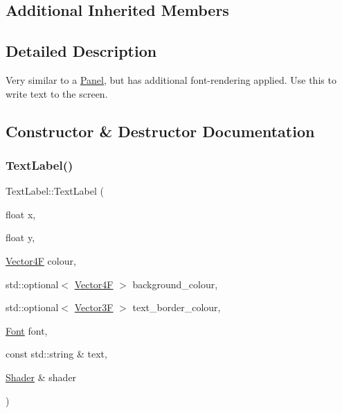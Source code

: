 \subsection*{Additional Inherited Members}


\subsection{Detailed Description}
Very similar to a \mbox{\hyperlink{class_panel}{Panel}}, but has additional font-\/rendering applied. Use this to write text to the screen. 

\subsection{Constructor \& Destructor Documentation}
\mbox{\label{class_text_label_a8736731b5c5f1a8cffa984cfc332a859}} 
\subsubsection{\texorpdfstring{Text\+Label()}{TextLabel()}}
{\footnotesize\ttfamily Text\+Label\+::\+Text\+Label (\begin{DoxyParamCaption}\item[{float}]{x,  }\item[{float}]{y,  }\item[{\mbox{\hyperlink{class_vector4}{Vector4F}}}]{colour,  }\item[{std\+::optional$<$ \mbox{\hyperlink{class_vector4}{Vector4F}} $>$}]{background\+\_\+colour,  }\item[{std\+::optional$<$ \mbox{\hyperlink{class_vector3}{Vector3F}} $>$}]{text\+\_\+border\+\_\+colour,  }\item[{\mbox{\hyperlink{class_font}{Font}}}]{font,  }\item[{const std\+::string \&}]{text,  }\item[{\mbox{\hyperlink{class_shader}{Shader}} \&}]{shader }\end{DoxyParamCaption})}

